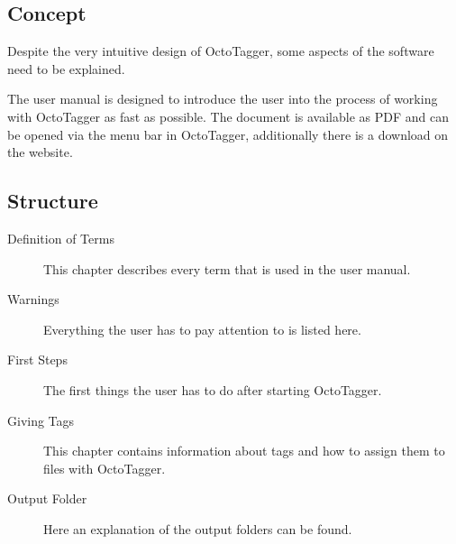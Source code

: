 \subsection{Concept}

Despite the very intuitive design of OctoTagger, some aspects of the software need to be explained.

The user manual is designed to introduce the user into the process of working with OctoTagger as fast as possible. The document is available as PDF and can be opened via the menu bar in OctoTagger, additionally there is a download on the website.

\subsection{Structure}

\begin{description}
\item [Definition of Terms] This chapter describes every term that is used in the user manual.
\item [Warnings] Everything the user has to pay attention to is listed here.
\item [First Steps] The first things the user has to do after starting OctoTagger.
\item [Giving Tags] This chapter contains information about tags and how to assign them to files with OctoTagger.
\item [Output Folder] Here an explanation of the output folders can be found.

\end{description}